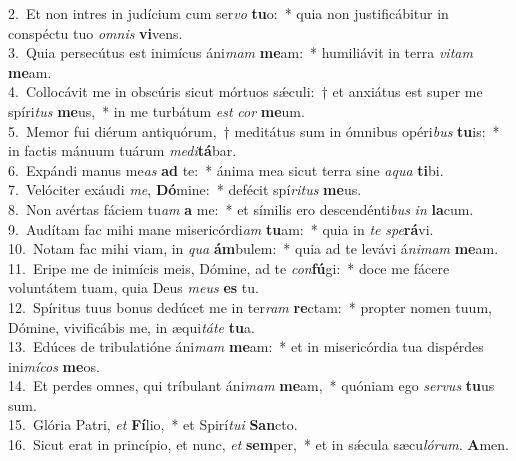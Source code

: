 {2.~}Et non intres in judícium cum ser\textit{vo} \textbf{tu}o:~* quia non justificábitur in conspéctu tuo \textit{om}\textit{nis} \textbf{vi}vens.\\
{3.~}Quia persecútus est inimícus áni\textit{mam} \textbf{me}am:~* humiliávit in terra \textit{vi}\textit{tam} \textbf{me}am.\\
{4.~}Collocávit me in obscúris sicut mórtuos sǽculi:~† et anxiátus est super me spíri\textit{tus} \textbf{me}us,~* in me turbátum \textit{est} \textit{cor} \textbf{me}um.\\
{5.~}Memor fui diérum antiquórum,~† meditátus sum in ómnibus opéri\textit{bus} \textbf{tu}is:~* in factis mánuum tuárum \textit{me}\textit{di}\textbf{tá}bar.\\
{6.~}Expándi manus me\textit{as} \textbf{ad} te:~* ánima mea sicut terra sine \textit{a}\textit{qua} \textbf{ti}bi.\\
{7.~}Velóciter exáudi \textit{me}, \textbf{Dó}mine:~* defécit spí\textit{ri}\textit{tus} \textbf{me}us.\\
{8.~}Non avértas fáciem tu\textit{am} \textbf{a} me:~* et símilis ero descendénti\textit{bus} \textit{in} \textbf{la}cum.\\
{9.~}Audítam fac mihi mane misericórdi\textit{am} \textbf{tu}am:~* quia in \textit{te} \textit{spe}\textbf{rá}vi.\\
{10.~}Notam fac mihi viam, in \textit{qua} \textbf{ám}bulem:~* quia ad te levávi á\textit{ni}\textit{mam} \textbf{me}am.\\
{11.~}Eripe me de inimícis meis, Dómine, ad te \textit{con}\textbf{fú}gi:~* doce me fácere voluntátem tuam, quia Deus \textit{me}\textit{us} \textbf{es} tu.\\
{12.~}Spíritus tuus bonus dedúcet me in ter\textit{ram} \textbf{re}ctam:~* propter nomen tuum, Dómine, vivificábis me, in æqui\textit{tá}\textit{te} \textbf{tu}a.\\
{13.~}Edúces de tribulatióne áni\textit{mam} \textbf{me}am:~* et in misericórdia tua dispérdes ini\textit{mí}\textit{cos} \textbf{me}os.\\
{14.~}Et perdes omnes, qui tríbulant áni\textit{mam} \textbf{me}am,~* quóniam ego \textit{ser}\textit{vus} \textbf{tu}us sum.\\
{15.~}Glória Patri, \textit{et} \textbf{Fí}lio,~* et Spirí\textit{tu}\textit{i} \textbf{San}cto.\\
{16.~}Sicut erat in princípio, et nunc, \textit{et} \textbf{sem}per,~* et in sǽcula sæcu\textit{ló}\textit{rum}. \textbf{A}men.\\

